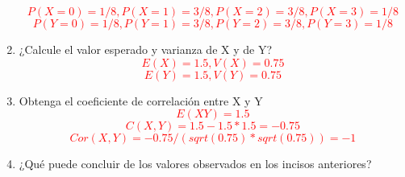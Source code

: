 \documentclass[addpoints]{exam}
\theoremstyle{mytheor}
\begin{document}
\begin{questions}
\begin{enumerate}
    \textcolor{red}{$$P(X = 0) = 1/8, P(X = 1) = 3/8, P(X = 2) = 3/8, P(X = 3) = 1/8 $$}
    \textcolor{red}{$$P(Y = 0) = 1/8, P(Y = 1) = 3/8, P(Y = 2) = 3/8, P(Y = 3) = 1/8 $$}
   
   \item ¿Calcule el valor esperado y varianza de X y de Y? \\
    \textcolor{red}{$$E(X) = 1.5, V(X) = 0.75$$}
    \textcolor{red}{$$E(Y) = 1.5, V(Y) = 0.75$$}
   
   \item Obtenga el coeficiente de correlación entre X y Y
    \textcolor{red}{$$E(XY) = 1.5$$}
    \textcolor{red}{$$C(X,Y) = 1.5-1.5*1.5 = -0.75$$}
    \textcolor{red}{$$Cor(X,Y) = -0.75/(sqrt(0.75)*sqrt(0.75)) = -1$$}
   
   \item ¿Qué puede concluir de los valores observados en los incisos anteriores?
   \end{enumerate}
  
   
\end{questions} 
\end{document}
